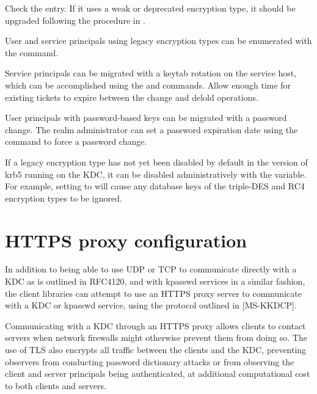 \documentclass[letterpaper,10pt,english]{sphinxmanual}
\begin{document}
Check the  entry.  If it uses a weak or deprecated encryption
type, it should be upgraded following the procedure in
{\hyperref[\detokenize{admin/database:updating-master-key}]{}}.

User and service principals using legacy encryption types can be
enumerated with the {\hyperref[\detokenize{admin/admin_commands/kdb5_util:kdb5-util-8}]{}}  command.

Service principals can be migrated with a keytab rotation on the
service host, which can be accomplished using the {\hyperref[\detokenize{admin/admin_commands/k5srvutil:k5srvutil-1}]{}}
 and  commands.  Allow enough time for existing
tickets to expire between the change and delold operations.

User principals with password-based keys can be migrated with a
password change.  The realm administrator can set a password
expiration date using the {\hyperref[\detokenize{admin/admin_commands/kadmin_local:kadmin-1}]{}}  command to force a password change.

If a legacy encryption type has not yet been disabled by default in
the version of krb5 running on the KDC, it can be disabled
administratively with the  variable.  For
example, setting  to  will
cause any database keys of the triple-DES and RC4 encryption types to
be ignored.


\chapter{HTTPS proxy configuration}
\label{\detokenize{admin/https:https-proxy-configuration}}\label{\detokenize{admin/https::doc}}\label{\detokenize{admin/https:https}}
In addition to being able to use UDP or TCP to communicate directly
with a KDC as is outlined in RFC4120, and with kpasswd services in a
similar fashion, the client libraries can attempt to use an HTTPS
proxy server to communicate with a KDC or kpasswd service, using the
protocol outlined in {[}MS-KKDCP{]}.

Communicating with a KDC through an HTTPS proxy allows clients to
contact servers when network firewalls might otherwise prevent them
from doing so.  The use of TLS also encrypts all traffic between the
clients and the KDC, preventing observers from conducting password
dictionary attacks or from observing the client and server principals
being authenticated, at additional computational cost to both clients
and servers.
\end{document}

